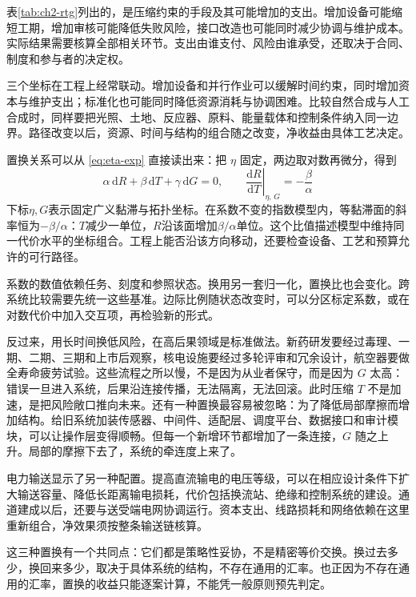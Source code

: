 表\ref{tab:ch2-rtg}列出的，是压缩约束的手段及其可能增加的支出。增加设备可能缩短工期，增加审核可能降低失败风险，接口改造也可能同时减少协调与维护成本。实际结果需要核算全部相关环节。支出由谁支付、风险由谁承受，还取决于合同、制度和参与者的决定权。


三个坐标在工程上经常联动。增加设备和并行作业可以缓解时间约束，同时增加资本与维护支出；标准化也可能同时降低资源消耗与协调困难。比较自然合成与人工合成时，同样要把光照、土地、反应器、原料、能量载体和控制条件纳入同一边界。路径改变以后，资源、时间与结构的组合随之改变，净收益由具体工艺决定。

置换关系可以从 \eqref{eq:eta-exp} 直接读出来：把 $\eta$ 固定，两边取对数再微分，得到
\begin{equation}
\alpha\,\mathrm{d}R+\beta\,\mathrm{d}T+\gamma\,\mathrm{d}G=0,
\qquad
\left.\frac{\mathrm{d}R}{\mathrm{d}T}\right|_{\eta,\,G}=-\frac{\beta}{\alpha}
\label{eq:exchange-rate}
\end{equation}
下标$\eta,G$表示固定广义黏滞与拓扑坐标。在系数不变的指数模型内，等黏滞面的斜率恒为$-\beta/\alpha$：$T$减少一单位，$R$沿该面增加$\beta/\alpha$单位。这个比值描述模型中维持同一代价水平的坐标组合。工程上能否沿该方向移动，还要检查设备、工艺和预算允许的可行路径。

系数的数值依赖任务、刻度和参照状态。换用另一套归一化，置换比也会变化。跨系统比较需要先统一这些基准。边际比例随状态改变时，可以分区标定系数，或在对数代价中加入交互项，再检验新的形式。

反过来，用长时间换低风险，在高后果领域是标准做法。新药研发要经过毒理、一期、二期、三期和上市后观察，核电设施要经过多轮评审和冗余设计，航空器要做全寿命疲劳试验。这些流程之所以慢，不是因为从业者保守，而是因为 $G$ 太高：错误一旦进入系统，后果沿连接传播，无法隔离，无法回滚。此时压缩 $T$ 不是加速，是把风险敞口推向未来。还有一种置换最容易被忽略：为了降低局部摩擦而增加结构。给旧系统加装传感器、中间件、适配层、调度平台、数据接口和审计模块，可以让操作层变得顺畅。但每一个新增环节都增加了一条连接，$G$ 随之上升。局部的摩擦下去了，系统的牵连度上来了。

电力输送显示了另一种配置。提高直流输电的电压等级，可以在相应设计条件下扩大输送容量、降低长距离输电损耗，代价包括换流站、绝缘和控制系统的建设。通道建成以后，还要与送受端电网协调运行。资本支出、线路损耗和网络依赖在这里重新组合，净效果须按整条输送链核算。

这三种置换有一个共同点：它们都是策略性妥协，不是精密等价交换。换过去多少，换回来多少，取决于具体系统的结构，不存在通用的汇率。也正因为不存在通用的汇率，置换的收益只能逐案计算，不能凭一般原则预先判定。

